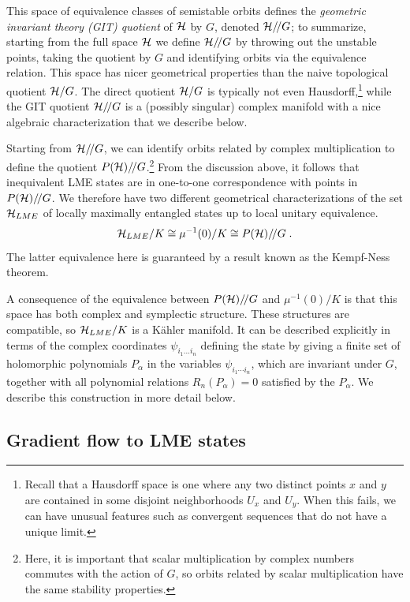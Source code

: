 \documentclass[12pt]{article}
\theoremstyle{definition}
\newcommand{\be}{\begin{equation}}
\newcommand{\ee}{\end{equation}}
\newcommand{\GITquot}{/\!/}
\begin{document}
This space of equivalence classes of semistable orbits defines the {\it geometric invariant theory (GIT) quotient} of ${\cal H}$ by $G$, denoted ${\cal H}\GITquot G$; to summarize, starting from the full space ${\cal H}$ we define ${\cal H}\GITquot G$ by throwing out the unstable points, taking the quotient by $G$ and identifying orbits via the equivalence relation. This space has nicer geometrical properties than the naive topological quotient ${\cal H}/G$. The direct quotient ${\cal H}/G$ is typically not even Hausdorff,\footnote{Recall that a Hausdorff space is one where any two distinct points $x$ and $y$ are contained in some disjoint neighborhoods $U_x$ and $U_y$. When this fails, we can have unusual features such as convergent sequences that do not have a unique limit.} while the GIT quotient ${\cal H}\GITquot G$ is a (possibly singular) complex manifold with a nice algebraic characterization that we describe below.

Starting from ${\cal H}\GITquot G$, we can identify orbits related by complex multiplication to define the quotient $P({\cal H})\GITquot G$.\footnote{Here, it is important that scalar multiplication by complex numbers commutes with the action of $G$, so orbits related by scalar multiplication have the same stability properties.} From the discussion above, it follows that inequivalent LME states are in one-to-one correspondence with points in $P({\cal H})\GITquot G$. We therefore have two different geometrical characterizations of the set ${\cal H}_{LME}$ of locally maximally entangled states up to local unitary equivalence.
\be
{\cal H}_{LME}/K \cong \mu^{-1}(0)/K \cong P({\cal H})\GITquot G \; .
\ee
The latter equivalence here is guaranteed by a result known as the Kempf-Ness theorem.

A consequence of the equivalence between $P({\cal H})\GITquot G$ and
$\mu^{-1}(0)/K$ is that this space has both complex and symplectic
structure. These structures are compatible, so ${\cal H}_{LME}/K$ is a
K\"ahler manifold. It can be described explicitly in terms of the
complex coordinates $\psi_{i_1 \dots i_n}$ defining the state by
giving a finite set of holomorphic polynomials $P_{\alpha }$ in the
variables $\psi_{i_{1}\dotsb i_{n}}$, which are invariant under $G$,
together with all polynomial relations $R_n(P_\alpha ) = 0$ satisfied
by the $P_{\alpha }$. We describe this construction in more detail below.

\subsection{Gradient flow to LME states}
\end{document}
